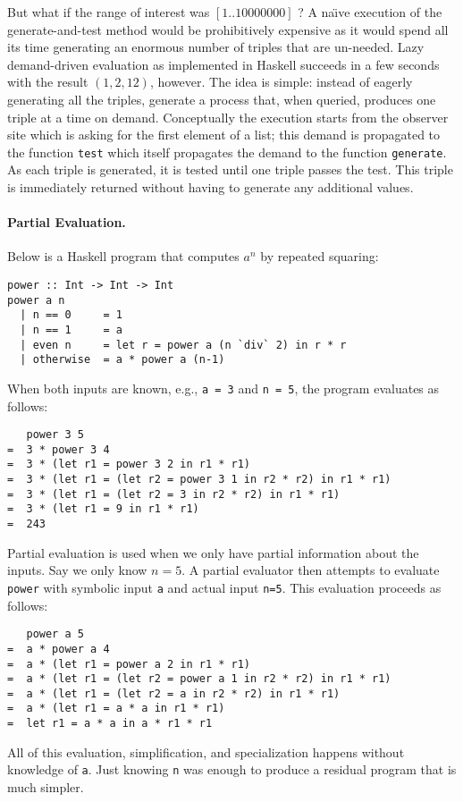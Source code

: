 \documentclass{article}
\begin{document}
\begin{refsection}
But what if the range of interest was $[1..10000000]$ ? A na\"\i ve
execution of the generate-and-test method would be prohibitively
expensive as it would spend all its time generating an enormous number
of triples that are un-needed. Lazy demand-driven evaluation as
implemented in Haskell succeeds in a few seconds with the result
$(1,2,12)$, however. The idea is simple: instead of eagerly generating
all the triples, generate a process that, when queried, produces one
triple at a time on demand. Conceptually the execution starts from the
observer site which is asking for the first element of a list; this
demand is propagated to the function \verb|test| which itself
propagates the demand to the function \verb|generate|. As each triple
is generated, it is tested until one triple passes the test. This
triple is immediately returned without having to generate any
additional values.

\paragraph*{Partial Evaluation.}
Below is a Haskell program that computes $a^n$ by repeated squaring:
\begin{verbatim}
power :: Int -> Int -> Int
power a n
  | n == 0     = 1
  | n == 1     = a
  | even n     = let r = power a (n `div` 2) in r * r 
  | otherwise  = a * power a (n-1)
\end{verbatim}
When both inputs are known, e.g., \verb|a = 3| and \verb|n = 5|, the
program evaluates as follows:
\begin{verbatim}
   power 3 5
=  3 * power 3 4
=  3 * (let r1 = power 3 2 in r1 * r1)
=  3 * (let r1 = (let r2 = power 3 1 in r2 * r2) in r1 * r1)
=  3 * (let r1 = (let r2 = 3 in r2 * r2) in r1 * r1)
=  3 * (let r1 = 9 in r1 * r1)
=  243
\end{verbatim}

Partial evaluation is used when we only have partial information about
the inputs. Say we only know $n=5$. A partial evaluator then attempts
to evaluate \verb|power| with symbolic input \verb|a| and actual input
\verb|n=5|. This evaluation proceeds as follows:
\begin{verbatim}
   power a 5 
=  a * power a 4 
=  a * (let r1 = power a 2 in r1 * r1)
=  a * (let r1 = (let r2 = power a 1 in r2 * r2) in r1 * r1)
=  a * (let r1 = (let r2 = a in r2 * r2) in r1 * r1)
=  a * (let r1 = a * a in r1 * r1)
=  let r1 = a * a in a * r1 * r1
\end{verbatim}
All of this evaluation, simplification, and specialization happens
without knowledge of \verb|a|. Just knowing \verb|n| was enough to
produce a residual program that is much simpler. 


\end{refsection}
\end{document}
